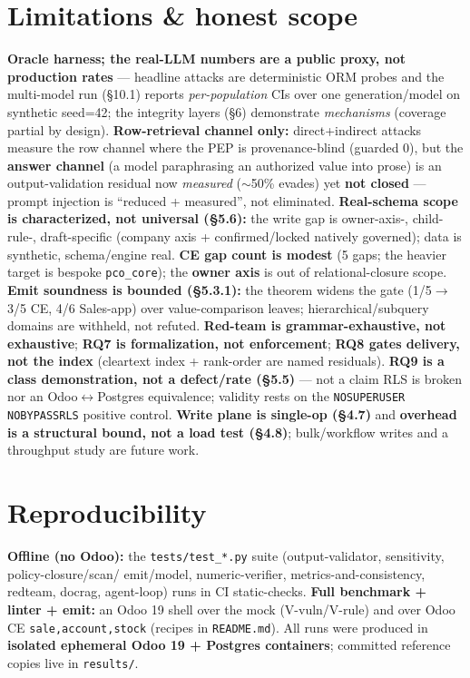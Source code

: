 \documentclass[runningheads]{llncs}
\newcommand{\code}[1]{\texttt{#1}}
\begin{document}
\section{Limitations \& honest scope}
\textbf{Oracle harness; the real-LLM numbers are a public proxy, not production rates} --- headline attacks are
deterministic ORM probes and the multi-model run (\S10.1) reports \emph{per-population} CIs over one
generation/model on synthetic seed=42; the integrity layers (\S6) demonstrate \emph{mechanisms} (coverage partial
by design). \textbf{Row-retrieval channel only:} direct+indirect attacks measure the row channel where the PEP is
provenance-blind (guarded 0), but the \textbf{answer channel} (a model paraphrasing an authorized value into prose)
is an output-validation residual now \emph{measured} ($\sim$50\% evades) yet \textbf{not closed} --- prompt
injection is ``reduced + measured'', not eliminated. \textbf{Real-schema scope is characterized, not universal
(\S5.6):} the write gap is owner-axis-, child-rule-, draft-specific (company axis + confirmed/locked natively
governed); data is synthetic, schema/engine real. \textbf{CE gap count is modest} (5 gaps; the heavier target is
bespoke \code{pco_core}); the \textbf{owner axis} is out of relational-closure scope. \textbf{Emit soundness is
bounded (\S5.3.1):} the theorem widens the gate (1/5$\to$3/5 CE, 4/6 Sales-app) over value-comparison leaves;
hierarchical/subquery domains are withheld, not refuted. \textbf{Red-team is grammar-exhaustive, not exhaustive};
\textbf{RQ7 is formalization, not enforcement}; \textbf{RQ8 gates delivery, not the index} (cleartext index +
rank-order are named residuals). \textbf{RQ9 is a class demonstration, not a defect/rate (\S5.5)} --- not a claim
RLS is broken nor an Odoo$\leftrightarrow$Postgres equivalence; validity rests on the \code{NOSUPERUSER NOBYPASSRLS}
positive control. \textbf{Write plane is single-op (\S4.7)} and \textbf{overhead is a structural bound, not a load
test (\S4.8)}; bulk/workflow writes and a throughput study are future work.

\section{Reproducibility}
\textbf{Offline (no Odoo):} the \code{tests/test_*.py} suite (output-validator, sensitivity, policy-closure/scan/
emit/model, numeric-verifier, metrics-and-consistency, redteam, docrag, agent-loop) runs in CI static-checks.
\textbf{Full benchmark + linter + emit:} an Odoo 19 shell over the mock (V-vuln/V-rule) and over Odoo CE
\code{sale,account,stock} (recipes in \code{README.md}). All runs were produced in \textbf{isolated ephemeral
Odoo 19 + Postgres containers}; committed reference copies live in \code{results/}.
\end{document}
